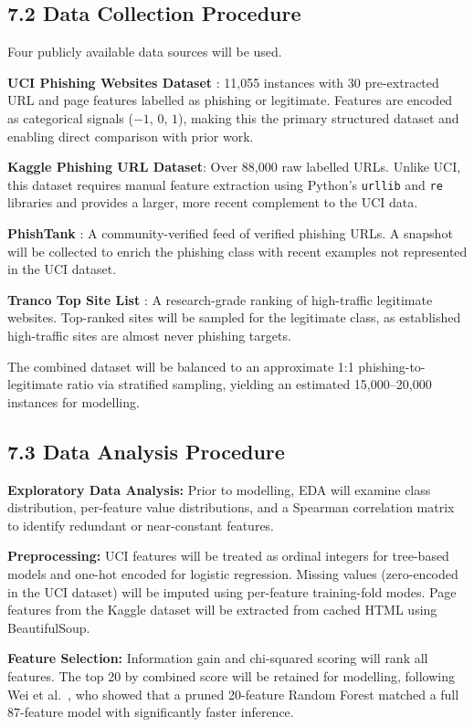 \documentclass[11pt,letterpaper]{article}
\begin{document}
\subsection*{7.2 Data Collection Procedure}

Four publicly available data sources will be used.

\textbf{UCI Phishing Websites Dataset} \cite{uci_phishing}: 11,055 instances with 30 pre-extracted URL and page features labelled as phishing or legitimate. Features are encoded as categorical signals ($-1$, $0$, $1$), making this the primary structured dataset and enabling direct comparison with prior work.

\textbf{Kaggle Phishing URL Dataset}: Over 88,000 raw labelled URLs. Unlike UCI, this dataset requires manual feature extraction using Python's \texttt{urllib} and \texttt{re} libraries and provides a larger, more recent complement to the UCI data.

\textbf{PhishTank} \cite{phishtank}: A community-verified feed of verified phishing URLs. A snapshot will be collected to enrich the phishing class with recent examples not represented in the UCI dataset.

\textbf{Tranco Top Site List} \cite{tranco}: A research-grade ranking of high-traffic legitimate websites. Top-ranked sites will be sampled for the legitimate class, as established high-traffic sites are almost never phishing targets.

The combined dataset will be balanced to an approximate 1:1 phishing-to-legitimate ratio via stratified sampling, yielding an estimated 15,000--20,000 instances for modelling.

\subsection*{7.3 Data Analysis Procedure}

\textbf{Exploratory Data Analysis:} Prior to modelling, EDA will examine class distribution, per-feature value distributions, and a Spearman correlation matrix to identify redundant or near-constant features.

\textbf{Preprocessing:} UCI features will be treated as ordinal integers for tree-based models and one-hot encoded for logistic regression. Missing values (zero-encoded in the UCI dataset) will be imputed using per-feature training-fold modes. Page features from the Kaggle dataset will be extracted from cached HTML using BeautifulSoup.

\textbf{Feature Selection:} Information gain and chi-squared scoring will rank all features. The top 20 by combined score will be retained for modelling, following Wei et al.\ \cite{wei2020}, who showed that a pruned 20-feature Random Forest matched a full 87-feature model with significantly faster inference.
\end{document}
